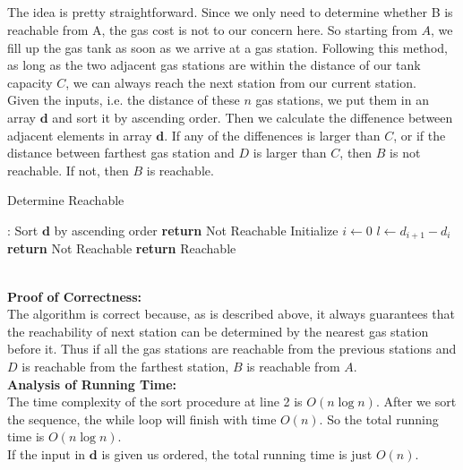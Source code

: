 \documentclass[12pt,letterpaper]{article}
\begin{document}
\subsection{}
The idea is pretty straightforward.
Since we only need to determine whether B is reachable from A, 
the gas cost is not to our concern here.
So starting from $A$, we fill up the gas tank as soon as we arrive at a gas station.
Following this method, as long as the two adjacent gas stations are within the distance of our tank capacity $C$,
we can always reach the next station from our current station. \\
Given the inputs, i.e. the distance of these $n$ gas stations, we put them in an array $\boldsymbol{d}$ and sort it by ascending order.
Then we calculate the diffenence between adjacent elements in array $\boldsymbol{d}$.
If any of the diffenences is larger than $C$, 
or if the distance between farthest gas station and $D$ is larger than $C$, then $B$ is not reachable.
If not, then $B$ is reachable.  
\begin{algorithm}
  \caption{Determine Reachable}\label{alg:deterreach}
  \begin{algorithmic}[1]
  :
  \State Sort $\boldsymbol{d}$ by ascending order
  \State \textbf{return} Not Reachable
  \EndIf
  \State Initialize $i\gets 0$
  \State $l\gets d_{i+1}-d_i$
  \State \textbf{return} Not Reachable
  \EndIf
  \EndWhile
  \State \textbf{return} Reachable
  \EndProcedure
  \end{algorithmic}
\end{algorithm}\\
\textbf{Proof of Correctness:}\\
The algorithm is correct because, as is described above, 
it always guarantees that the reachability of next station can be determined by the nearest gas station before it.
Thus if all the gas stations are reachable from the previous stations and $D$ is reachable from the farthest station, 
$B$ is reachable from $A$.\\
\textbf{Analysis of Running Time:}\\
The time complexity of the sort procedure at line 2 is $O(n\log n)$.
After we sort the sequence, the while loop will finish with time $O(n)$.
So the total running time is $O(n\log n)$.\\
If the input in $\boldsymbol{d}$ is given us ordered,
the total running time is just $O(n)$.
\end{document}
